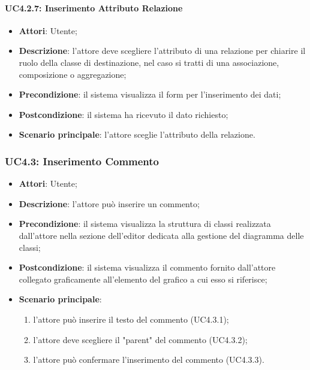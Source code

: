 \begin{itemize}
\begin{itemize}
\begin{itemize}
\begin{itemize}
\paragraph{UC4.2.7: Inserimento Attributo Relazione}
\label{UC4.2.7}
\begin{itemize}
	\item \textbf{Attori}: Utente;
	\item \textbf{Descrizione}: l'attore deve scegliere l'attributo di una relazione per chiarire il ruolo della classe di destinazione, nel caso si tratti di una associazione, composizione o aggregazione;
	\item \textbf{Precondizione}: il sistema visualizza il form per l'inserimento dei dati;
	\item \textbf{Postcondizione}: il sistema ha ricevuto il dato richiesto;
	\item \textbf{Scenario principale}: l'attore sceglie l'attributo della relazione.
\end{itemize}

\subsubsection{UC4.3: Inserimento Commento}
\label{UC4.3}
\begin{itemize}
	\item \textbf{Attori}: Utente;
	\item \textbf{Descrizione}: l'attore può inserire un commento;
	\item \textbf{Precondizione}: il sistema visualizza la struttura di classi realizzata dall'attore nella sezione dell'editor dedicata alla gestione del diagramma delle classi;
	\item \textbf{Postcondizione}: il sistema visualizza il commento fornito dall'attore collegato graficamente all'elemento del grafico a cui esso si riferisce;
	\item \textbf{Scenario principale}:
	\begin{enumerate}
		\item l'attore può inserire il testo del commento (UC4.3.1);
		\item l'attore deve scegliere il "parent" del commento (UC4.3.2);
		\item l'attore può confermare l'inserimento del commento (UC4.3.3).
	\end{enumerate}
\end{itemize}


\end{itemize}
\end{itemize}
\end{itemize}
\end{itemize}
